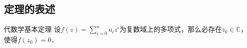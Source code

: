 


\subsection{定理的表述}

\begin{definition}{代数学基本定理}
设$f(z)=\sum\limits_{i=0}^n a_iz^i$为复数域上的多项式，那么必存在$z_0\in\mathbb{C}$，使得$f(z_0)=0$．
\end{definition}


